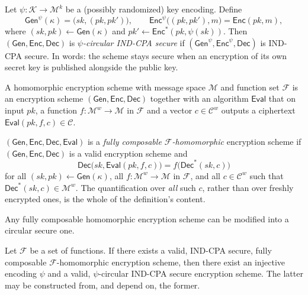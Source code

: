 \documentclass{aicr-conjecture}
\newcommand{\Gen}{\mathsf{Gen}}
\newcommand{\Enc}{\mathsf{Enc}}
\newcommand{\Dec}{\mathsf{Dec}}
\newcommand{\Eval}{\mathsf{Eval}}
\newcommand{\Msp}{\mathcal{M}}
\newcommand{\Csp}{\mathcal{C}}
\newcommand{\Ksp}{\mathcal{K}}
\newcommand{\Fset}{\mathcal{F}}
\newcommand{\secpar}{\kappa}
\begin{document}
\begin{definition}\label{def:circular}
Let $\psi : \Ksp \to \Msp^{k}$ be a (possibly randomized) key encoding.
Define
\[
  \Gen^{\psi}(\secpar) = \bigl(sk, (pk, pk')\bigr),
  \qquad
  \Enc^{\psi}\bigl((pk, pk'), m\bigr) = \Enc(pk, m),
\]
where $(sk, pk) \gets \Gen(\secpar)$ and $pk' \gets \Enc^{*}(pk,
\psi(sk))$. Then $(\Gen, \Enc, \Dec)$ is \emph{$\psi$-circular IND-CPA
secure} if $(\Gen^{\psi}, \Enc^{\psi}, \Dec)$ is IND-CPA secure. In
words: the scheme stays secure when an encryption of its own secret key
is published alongside the public key.
\end{definition}

\begin{definition}\label{def:homomorphic}
A homomorphic encryption scheme with message space $\Msp$ and function
set $\Fset$ is an encryption scheme $(\Gen, \Enc, \Dec)$ together with
an algorithm $\Eval$ that on input $pk$, a function $f : \Msp^{w} \to
\Msp$ in $\Fset$ and a vector $c \in \Csp^{w}$ outputs a ciphertext
$\Eval(pk, f, c) \in \Csp$.
\end{definition}

\begin{definition}\label{def:composable}
$(\Gen, \Enc, \Dec, \Eval)$ is a \emph{fully composable
$\Fset$-homomorphic} encryption scheme if $(\Gen, \Enc, \Dec)$ is a
valid encryption scheme and
\[
  \Dec\bigl(sk, \Eval(pk, f, c)\bigr) = f\bigl(\Dec^{*}(sk, c)\bigr)
\]
for all $(sk, pk) \gets \Gen(\secpar)$, all $f : \Msp^{w} \to \Msp$ in
$\Fset$, and all $c \in \Csp^{w}$ such that $\Dec^{*}(sk, c) \in
\Msp^{w}$. The quantification over \emph{all} such $c$, rather than
over freshly encrypted ones, is the whole of the definition's content.
\end{definition}

\begin{conjecture}\label{conj:printed}
Any fully composable homomorphic encryption scheme can be modified into
a circular secure one.
\end{conjecture}

\begin{conjecture}\label{conj:formal}
Let $\Fset$ be a set of functions. If there exists a valid, IND-CPA
secure, fully composable $\Fset$-homomorphic encryption scheme, then
there exist an injective encoding $\psi$ and a valid, $\psi$-circular
IND-CPA secure encryption scheme. The latter may be constructed from,
and depend on, the former.
\end{conjecture}
\end{document}
